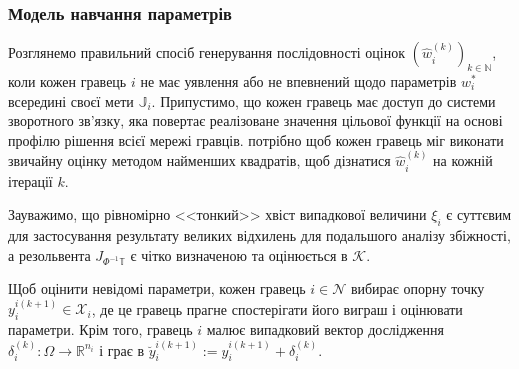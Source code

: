 \documentclass[a4paper]{article}
\begin{document}
\subsubsection{Модель навчання параметрів}
Розглянемо правильний спосіб генерування послідовності оцінок $(\hat{w}_{i}^{(k)})_{k \in \mathbb{N}}$, коли кожен гравець $i$ не має уявлення або не впевнений щодо параметрів $w_{i}^{*}$ всередині своєї мети $\mathbb{J}_{i}$. Припустимо, що кожен гравець має доступ до системи зворотного зв’язку, яка повертає реалізоване значення цільової функції на основі профілю рішення всієї мережі гравців. потрібно щоб кожен гравець міг виконати звичайну оцінку методом найменших квадратів, щоб дізнатися $\hat{w}_{i}^{(k)}$ на кожній ітерації $k$.

Зауважимо, що рівномірно <<тонкий>> хвіст випадкової величини $\xi_{i}$ є суттєвим для застосування результату великих відхилень для подальшого аналізу збіжності, а резольвента $J_{\Phi^{-1} \mathbb{T}}$ є чітко визначеною та оцінюється в $\mathcal{K}$.

Щоб оцінити невідомі параметри, кожен гравець $i \in \mathcal{N}$ вибирає опорну точку $y_{i}^{i(k+1)} \in \mathcal{X}_{i}$, де це гравець прагне спостерігати його виграш і оцінювати параметри. Крім того, гравець $i$ малює випадковий вектор дослідження $\delta_{i}^{(k)}: \Omega \rightarrow \mathbb{R}^{n_{i}}$ і грає в $\breve{y}_ {i}^{i(k+1)}:=y_{i}^{i(k+1)}+\delta_{i}^{(k)}$.
\end{document}

